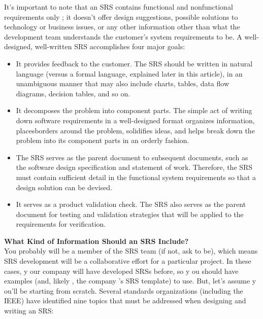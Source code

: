 It's important to note that an SRS contains functional and nonfunctional requirements only
; it
doesn't offer design suggestions, possible solutions to technology
 or business issues, or any other information other than what the development team understands the customer's system
requirements to be.
A well-designed, well-written SRS accomplishes four major goals:
\begin{itemize}
\item
It provides feedback to the customer. The SRS should be
written in natural language (versus a formal language, explained later in this article),
in an unambiguous manner that may
 also include charts, tables, data flow diagrams,
decision tables, and so on.

\item
It decomposes the problem into component parts. The simple act of writing down
software requirements in a well-designed format organizes information, placesborders around the problem, solidifies ideas, and helps break down the problem into
its component parts in an orderly
 fashion.

\item
The SRS serves as the parent document to subsequent documents, such as the software design specification and statement of work. Therefore, the SRS must contain sufficient detail in the functional system requirements so that a design solution can be devised.

\item It serves as a product validation check. The SRS also serves as the parent document
for testing and validation strategies that will be applied to the requirements for
verification.

\end{itemize}
\textbf{What Kind of Information Should an SRS Include?}\\

You probably
 will be a member of the SRS team (if not, ask to be), which means SRS
development will be a collaborative effort for a particular project. In these cases, y
our
company
 will have developed SRSs before, so y
ou should have examples (and, likely
, the
company
's SRS template) to use. But, let's assume y
ou'll be starting from scratch. Several
standards organizations (including the IEEE) have identified nine topics that must be
addressed when designing and writing an SRS:

